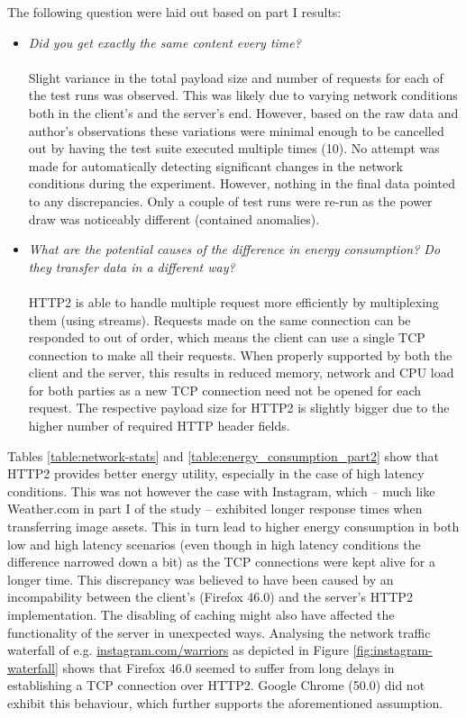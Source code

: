 \documentclass{article}
\begin{document}
The following question were laid out based on part I results:
\\
\begin{itemize}[label={}]
    \item \emph{Did you get exactly the same content every time?}\\\\
    Slight variance in the total payload size and number of requests for each of the test runs was observed. This was likely due to varying network conditions both in the client's and the server's end. However, based on the raw data and author's observations these variations were minimal enough to be cancelled out by having the test suite executed multiple times (10). No attempt was made for automatically detecting significant changes in the network conditions during the experiment. However, nothing in the final data pointed to any discrepancies. Only a couple of test runs were re-run as the power draw was noticeably different (contained anomalies).\\

    \item \emph{What are the potential causes of the difference in energy consumption? Do they transfer data in a different way?}\\\\
    HTTP2 is able to handle multiple request more efficiently by multiplexing them (using streams). Requests made on the same connection can be responded to out of order, which means the client can use a single TCP connection to make all their requests. When properly supported by both the client and the server, this results in reduced memory, network and CPU load for both parties as a new TCP connection need not be opened for each request. The respective payload size for HTTP2 is slightly bigger due to the higher number of required HTTP header fields.\\
\end{itemize}

Tables \ref{table:network-stats} and \ref{table:energy_consumption_part2} show that HTTP2 provides better energy utility, especially in the case of high latency conditions. This was not however the case with Instagram, which -- much like Weather.com in part I of the study -- exhibited longer response times when transferring image assets. This in turn lead to higher energy consumption in both low and high latency scenarios (even though in high latency conditions the difference narrowed down a bit) as the TCP connections were kept alive for a longer time. This discrepancy was believed to have been caused by an incompability between the client's (Firefox 46.0) and the server's HTTP2 implementation. The disabling of caching might also have affected the functionality of the server in unexpected ways. Analysing the network traffic waterfall of e.g. \url{instagram.com/warriors} as depicted in Figure \ref{fig:instagram-waterfall} shows that Firefox 46.0 seemed to suffer from long delays in establishing a TCP connection over HTTP2. Google Chrome (50.0) did not exhibit this behaviour, which further supports the aforementioned assumption.
\end{document}
